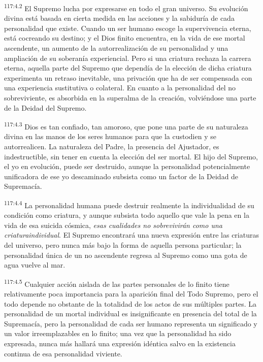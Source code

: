 \par
\textsuperscript{117:4.2} El Supremo lucha por expresarse en todo el gran universo. Su evolución divina está basada en cierta medida en las acciones y la sabiduría de cada personalidad que existe. Cuando un ser humano escoge la supervivencia eterna, está cocreando su destino; y el Dios finito encuentra, en la vida de ese mortal ascendente, un aumento de la autorrealización de su personalidad y una ampliación de su soberanía experiencial. Pero si una criatura rechaza la carrera eterna, aquella parte del Supremo que dependía de la elección de dicha criatura experimenta un retraso inevitable, una privación que ha de ser compensada con una experiencia sustitutiva o colateral. En cuanto a la personalidad del no sobreviviente, es absorbida en la superalma de la creación, volviéndose una parte de la Deidad del Supremo.

\par
\textsuperscript{117:4.3} Dios es tan confiado, tan amoroso, que pone una parte de su naturaleza divina en las manos de los seres humanos para que la custodien y se autorrealicen. La naturaleza del Padre, la presencia del Ajustador, es indestructible, sin tener en cuenta la elección del ser mortal. El hijo del Supremo, el yo en evolución, puede ser destruido, aunque la personalidad potencialmente unificadora de ese yo descaminado subsista como un factor de la Deidad de Supremacía.

\par
\textsuperscript{117:4.4} La personalidad humana puede destruir realmente la individualidad de su condición como criatura, y aunque subsista todo aquello que vale la pena en la vida de esa suicida cósmica, \textit{esas cualidades no sobrevivirán como una criaturaindividual}. El Supremo encontrará una nueva expresión entre las criaturas del universo, pero nunca más bajo la forma de aquella persona particular; la personalidad única de un no ascendente regresa al Supremo como una gota de agua vuelve al mar.

\par
\textsuperscript{117:4.5} Cualquier acción aislada de las partes personales de lo finito tiene relativamente poca importancia para la aparición final del Todo Supremo, pero el todo depende no obstante de la totalidad de los actos de sus múltiples partes. La personalidad de un mortal individual es insignificante en presencia del total de la Supremacía, pero la personalidad de cada ser humano representa un significado y un valor irreemplazables en lo finito; una vez que la personalidad ha sido expresada, nunca más hallará una expresión idéntica salvo en la existencia continua de esa personalidad viviente.


